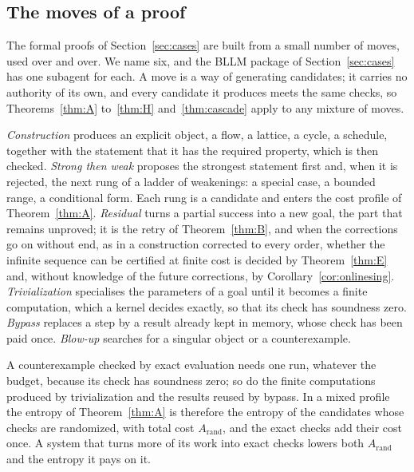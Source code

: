 \subsection{The moves of a proof}\label{ssec:moves}

The formal proofs of Section~\ref{sec:cases} are built from a small number of moves, used over and over. We name six, and the BLLM package of Section~\ref{sec:cases} has one subagent for each. A move is a way of generating candidates; it carries no authority of its own, and every candidate it produces meets the same checks, so Theorems~\ref{thm:A} to~\ref{thm:H} and~\ref{thm:cascade} apply to any mixture of moves.

\emph{Construction} produces an explicit object, a flow, a lattice, a cycle, a schedule, together with the statement that it has the required property, which is then checked. \emph{Strong then weak} proposes the strongest statement first and, when it is rejected, the next rung of a ladder of weakenings: a special case, a bounded range, a conditional form. Each rung is a candidate and enters the cost profile of Theorem~\ref{thm:A}. \emph{Residual} turns a partial success into a new goal, the part that remains unproved; it is the retry of Theorem~\ref{thm:B}, and when the corrections go on without end, as in a construction corrected to every order, whether the infinite sequence can be certified at finite cost is decided by Theorem~\ref{thm:E} and, without knowledge of the future corrections, by Corollary~\ref{cor:onlinesing}. \emph{Trivialization} specialises the parameters of a goal until it becomes a finite computation, which a kernel decides exactly, so that its check has soundness zero. \emph{Bypass} replaces a step by a result already kept in memory, whose check has been paid once. \emph{Blow-up} searches for a singular object or a counterexample.

\begin{remark}\label{rem:refutation}
A counterexample checked by exact evaluation needs one run, whatever the budget, because its check has soundness zero; so do the finite computations produced by trivialization and the results reused by bypass. In a mixed profile the entropy of Theorem~\ref{thm:A} is therefore the entropy of the candidates whose checks are randomized, with total cost $A_{\mathrm{rand}}$, and the exact checks add their cost once. A system that turns more of its work into exact checks lowers both $A_{\mathrm{rand}}$ and the entropy it pays on it.
\end{remark}

